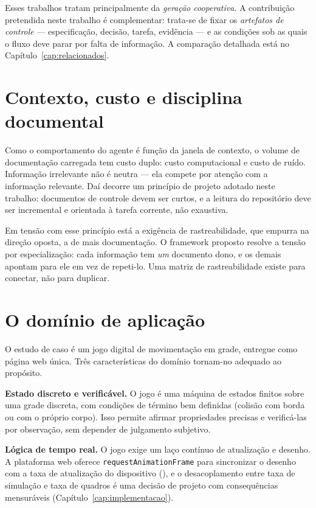 Esses trabalhos tratam principalmente da \emph{geração cooperativa}. A
contribuição pretendida neste trabalho é complementar: trata-se de fixar os
\emph{artefatos de controle} --- especificação, decisão, tarefa, evidência --- e
as condições sob as quais o fluxo deve parar por falta de informação. A
comparação detalhada está no Capítulo~\ref{cap:relacionados}.

\section{Contexto, custo e disciplina documental}
\label{sec:contexto-custo}

Como o comportamento do agente é função da janela de contexto, o volume de
documentação carregada tem custo duplo: custo computacional e custo de ruído.
Informação irrelevante não é neutra --- ela compete por atenção com a informação
relevante. Daí decorre um princípio de projeto adotado neste trabalho:
documentos de controle devem ser curtos, e a leitura do repositório deve ser
incremental e orientada à tarefa corrente, não exaustiva.

Em tensão com esse princípio está a exigência de rastreabilidade, que empurra na
direção oposta, a de mais documentação. O framework proposto resolve a tensão por
especialização: cada informação tem \emph{um} documento dono, e os demais
apontam para ele em vez de repeti-lo. Uma matriz de rastreabilidade existe para
conectar, não para duplicar.

\section{O domínio de aplicação}
\label{sec:dominio}

O estudo de caso é um jogo digital de movimentação em grade, entregue como página
web única. Três características do domínio tornam-no adequado ao propósito.

\textbf{Estado discreto e verificável.} O jogo é uma máquina de estados finitos
sobre uma grade discreta, com condições de término bem definidas (colisão com
borda ou com o próprio corpo). Isso permite afirmar propriedades precisas e
verificá-las por observação, sem depender de julgamento subjetivo.

\textbf{Lógica de tempo real.} O jogo exige um laço contínuo de atualização e
desenho. A plataforma web oferece \texttt{requestAnimationFrame} para
sincronizar o desenho com a taxa de atualização do dispositivo
(), e o desacoplamento entre taxa de simulação e taxa de
quadros é uma decisão de projeto com consequências mensuráveis
(Capítulo~\ref{cap:implementacao}).

